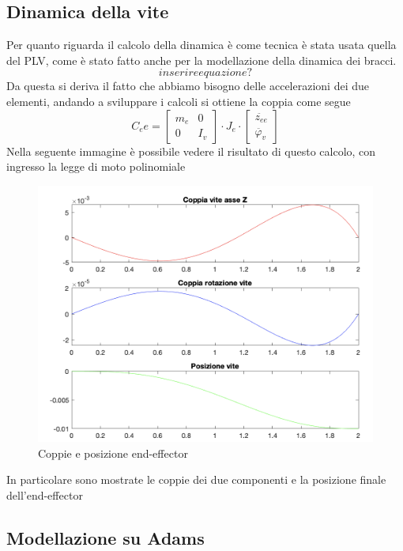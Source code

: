 \subsection{Dinamica della vite}
Per quanto riguarda il calcolo della dinamica è come tecnica è stata usata quella del PLV, come è stato fatto anche per la modellazione della dinamica dei bracci. 
\begin{equation*}
    inserire equazione?
\end{equation*}
Da questa si deriva il fatto che abbiamo bisogno delle accelerazioni dei due elementi, andando a sviluppare i calcoli si ottiene la coppia come segue
\begin{equation}
    C_ee = \begin{bmatrix}
    m_e & 0 \\ 0 & I_v
    \end{bmatrix}
    \cdot J_e\cdot \begin{bmatrix}
    \ddot{z_{ee}} \\ \ddot{\varphi_v}
    \end{bmatrix}
\end{equation}
Nella seguente immagine è possibile vedere il risultato di questo calcolo, con ingresso la legge di moto polinomiale
\begin{figure}[ht]
\begin{center}
    \includegraphics[scale=0.55]{Immagini/coppiaTeoricaVite.png}
    \caption{Coppie e posizione end-effector}
\end{center}
\end{figure}
In particolare sono mostrate le coppie dei due componenti e la posizione finale dell'end-effector
\subsection{Modellazione su Adams}